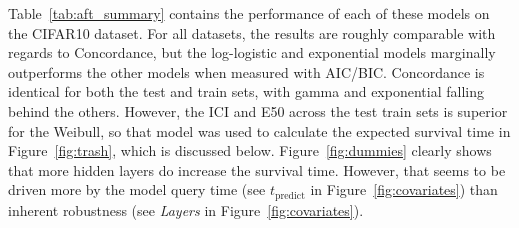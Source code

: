 Table~\ref{tab:aft_summary} contains the performance of each of these models on the CIFAR10 dataset.
For all datasets, the results are roughly comparable with regards to Concordance, but the log-logistic and exponential models marginally outperforms the other models when measured with AIC/BIC\@.
Concordance is identical for both the test and train sets, with gamma and exponential falling behind the others.
However, the ICI  and E50  across the test train sets is superior for the Weibull, so that model was used to calculate the expected survival time in Figure~\ref{fig:trash}, which is discussed below.
Figure~\ref{fig:dummies} clearly shows that more hidden layers do increase the survival time.
However, that seems to be driven more by the model query time (see $t_{\mathrm{predict}}$ in Figure~\ref{fig:covariates}) than inherent robustness (see \textit{Layers} in Figure~\ref{fig:covariates}).


